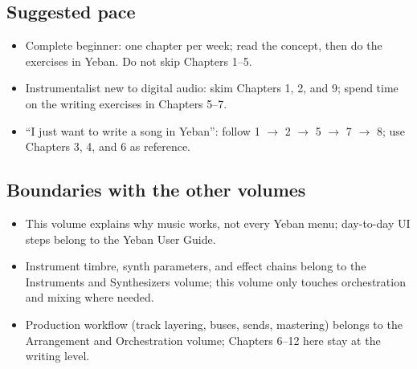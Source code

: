 \subsection*{Suggested pace}

\begin{itemize}
  \item Complete beginner: one chapter per week; read the concept, then do the exercises in Yeban. Do not skip Chapters 1–5.
  \item Instrumentalist new to digital audio: skim Chapters 1, 2, and 9; spend time on the writing exercises in Chapters 5–7.
  \item ``I just want to write a song in Yeban'': follow 1 $\rightarrow$ 2 $\rightarrow$ 5 $\rightarrow$ 7 $\rightarrow$ 8; use Chapters 3, 4, and 6 as reference.
\end{itemize}

\subsection*{Boundaries with the other volumes}

\begin{itemize}
  \item This volume explains why music works, not every Yeban menu; day-to-day UI steps belong to the Yeban User Guide.
  \item Instrument timbre, synth parameters, and effect chains belong to the Instruments and Synthesizers volume; this volume only touches orchestration and mixing where needed.
  \item Production workflow (track layering, buses, sends, mastering) belongs to the Arrangement and Orchestration volume; Chapters 6–12 here stay at the writing level.
\end{itemize}
